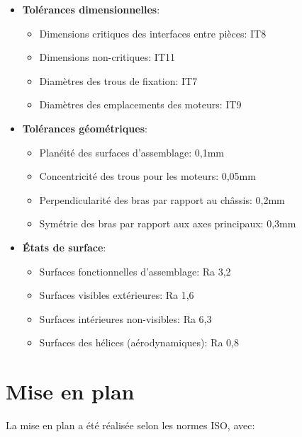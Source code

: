 \documentclass[a4paper,12pt]{report}
\begin{document}
\begin{itemize}
    \item \textbf{Tolérances dimensionnelles}:
    \begin{itemize}
        \item Dimensions critiques des interfaces entre pièces: IT8
        \item Dimensions non-critiques: IT11
        \item Diamètres des trous de fixation: IT7
        \item Diamètres des emplacements des moteurs: IT9
    \end{itemize}
    
    \item \textbf{Tolérances géométriques}:
    \begin{itemize}
        \item Planéité des surfaces d'assemblage: 0,1mm
        \item Concentricité des trous pour les moteurs: 0,05mm
        \item Perpendicularité des bras par rapport au châssis: 0,2mm
        \item Symétrie des bras par rapport aux axes principaux: 0,3mm
    \end{itemize}
    
    \item \textbf{États de surface}:
    \begin{itemize}
        \item Surfaces fonctionnelles d'assemblage: Ra 3,2
        \item Surfaces visibles extérieures: Ra 1,6
        \item Surfaces intérieures non-visibles: Ra 6,3
        \item Surfaces des hélices (aérodynamiques): Ra 0,8
    \end{itemize}
\end{itemize}

\section{Mise en plan}
La mise en plan a été réalisée selon les normes ISO, avec:
\end{document}

